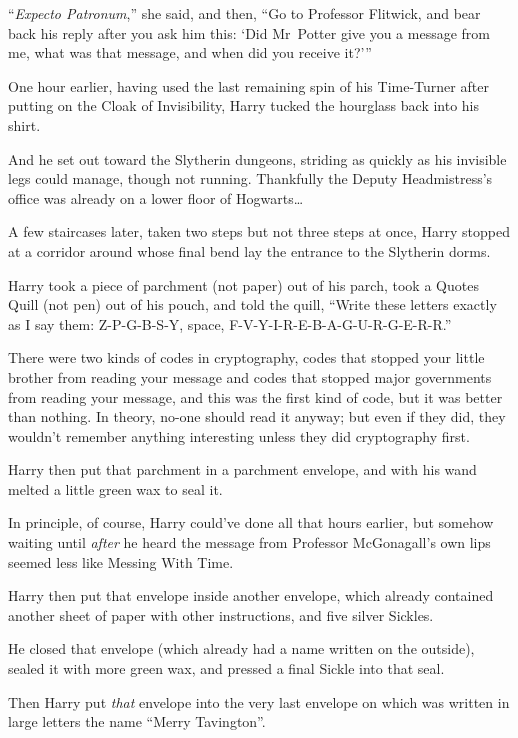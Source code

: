 “\emph{Expecto Patronum},” she said, and then, “Go to Professor Flitwick, and bear back his reply after you ask him this: ‘Did Mr~Potter give you a message from me, what was that message, and when did you receive it?’”

\later

One hour earlier, having used the last remaining spin of his Time-Turner after putting on the Cloak of Invisibility, Harry tucked the hourglass back into his shirt.

And he set out toward the Slytherin dungeons, striding as quickly as his invisible legs could manage, though not running. Thankfully the Deputy Headmistress’s office was already on a lower floor of Hogwarts…

A few staircases later, taken two steps but not three steps at once, Harry stopped at a corridor around whose final bend lay the entrance to the Slytherin dorms.

Harry took a piece of parchment (not paper) out of his parch, took a Quotes Quill (not pen) out of his pouch, and told the quill, “Write these letters exactly as I say them: Z-P-G-B-S-Y, space, F-V-Y-I-R-E-B-A-G-U-R-G-E-R-R.”

There were two kinds of codes in cryptography, codes that stopped your little brother from reading your message and codes that stopped major governments from reading your message, and this was the first kind of code, but it was better than nothing. In theory, no-one should read it anyway; but even if they did, they wouldn’t remember anything interesting unless they did cryptography first.

Harry then put that parchment in a parchment envelope, and with his wand melted a little green wax to seal it.

In principle, of course, Harry could’ve done all that hours earlier, but somehow waiting until \emph{after} he heard the message from Professor McGonagall’s own lips seemed less like Messing With Time.

Harry then put that envelope inside another envelope, which already contained another sheet of paper with other instructions, and five silver Sickles.

He closed that envelope (which already had a name written on the outside), sealed it with more green wax, and pressed a final Sickle into that seal.

Then Harry put \emph{that} envelope into the very last envelope on which was written in large letters the name “Merry Tavington”.

